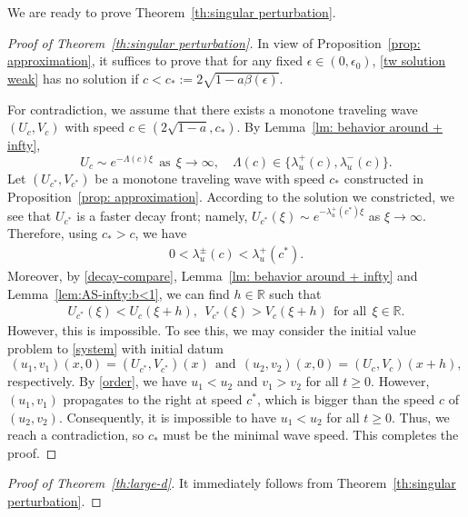 \documentclass[11pt,a4paper]{article}
\numberwithin{equation}{section}
\numberwithin{figure}{section}
\newcommand\ep{\epsilon}
\newcommand\bea{\begin{eqnarray}}
\newcommand\eea{\end{eqnarray}}
\begin{document}
\medskip

We are ready to prove Theorem~\ref{th:singular perturbation}.

\begin{proof}[Proof of Theorem~\ref{th:singular perturbation}]
In view of Proposition~\ref{prop: approximation}, it suffices to prove that for any fixed $\ep\in(0,\ep_0)$,
\eqref{tw solution weak} has no solution if $c<c_*:=2\sqrt{1-a\beta(\ep)}$.

For contradiction, we assume that
there exists a monotone traveling wave $(U_c,V_c)$ with speed $c\in(2\sqrt{1-a}, c_*)$.
By Lemma~\ref{lm: behavior around + infty}, %
$$U_c\sim e^{-\Lambda (c)\xi}\ \ \text{as}\ \ \xi\to\infty,\quad \Lambda (c)\in
\{\lambda_u^{+}(c), \lambda_u^{-}(c)\}.$$
Let $(U_{c^*},V_{c^*})$ be a monotone traveling wave with speed $c_*$ 
constructed in Proposition~\ref{prop: approximation}. According to the solution we constricted, we see that $U_{c^*}$ is a faster decay front; namely, 
$U_{c^*}(\xi)\sim e^{-\lambda_u^{+} (c^*)\xi}$ as $\xi\to\infty$. 
Therefore, using $c_*>c$, we have 
\bea\label{decay-compare}
0<\lambda_u^{\pm} (c)<\lambda_u^+ (c^*).
\eea
Moreover, by \eqref{decay-compare}, Lemma~\ref{lm: behavior around + infty} and Lemma~\ref{lem:AS-infty:b<1}, we can find $h\in\mathbb{R}$ such that
\bea\label{order}
U_{c^*}(\xi)<U_c(\xi+h),\ \ V_{c^*}(\xi)>V_c(\xi+h)\ \ \text{for all}\ \ \xi\in\mathbb{R}.
\eea
However, this is impossible. To see this, we may consider the initial value problem to \eqref{system} with initial datum
$$(u_1,v_1)(x,0)=(U_{c^*},V_{c^*})(x)\ \ \text{and}\ \ (u_2,v_2)(x,0)=(U_{c},V_{c})(x+h),$$
respectively. By \eqref{order},
we have $u_1<u_2$ and $v_1>v_2$ for all $t\geq0$. However, $(u_1,v_1)$ propagates to the right at speed $c^*$, which is bigger than
the speed $c$ of $(u_2,v_2)$. Consequently, it is impossible to have $u_1<u_2$ for all $t \geq 0$.
Thus, we reach a contradiction, so $c_*$ must be the minimal wave speed.
This completes the proof.
\end{proof}

\begin{proof}[Proof of Theorem~\ref{th:large-d}]
It immediately follows from Theorem~\ref{th:singular perturbation}.
\end{proof}
\end{document}
